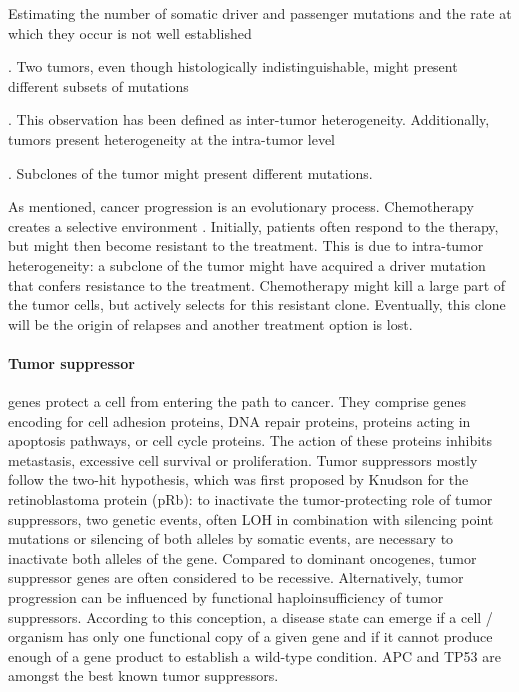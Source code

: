       Estimating the number of somatic driver and passenger mutations and the
      rate at which they occur is not well established {\cite{driver_passenger}.
      Two tumors, even though histologically indistinguishable, might present
      different subsets of mutations {\cite{driver_passenger}
      {\cite{intertumor}}. This observation has been defined as inter-tumor
      heterogeneity. Additionally, tumors present heterogeneity at the
      intra-tumor level {\cite{intratumor}. Subclones of the tumor might present
      different mutations.

      As mentioned, cancer progression is an evolutionary process. Chemotherapy
      creates a selective environment {\cite{selective_chemo}}. Initially,
      patients often respond to the therapy, but might then become resistant to
      the treatment. This is due to intra-tumor heterogeneity: a subclone of the
      tumor might have acquired a driver mutation that confers resistance to the
      treatment. Chemotherapy might kill a large part of the tumor cells, but
      actively selects for this resistant clone. Eventually, this clone will be
      the origin of relapses and another treatment option is lost.

      \paragraph{Tumor suppressor} genes protect a cell from entering the path
      to cancer. They comprise genes encoding for cell adhesion proteins,  DNA
      repair proteins, proteins acting in apoptosis pathways, or cell cycle
      proteins. The action of these proteins inhibits metastasis, excessive cell
      survival or proliferation. Tumor suppressors mostly follow the two-hit
      hypothesis, which was first proposed by Knudson for the retinoblastoma
      protein (pRb): to inactivate the tumor-protecting role of tumor
      suppressors, two genetic events, often LOH in  combination with silencing
      point mutations or silencing of both alleles by somatic events, are
      necessary to inactivate both alleles of the gene.
      Compared to dominant oncogenes, tumor suppressor genes are often
      considered to be recessive. Alternatively, tumor progression can be
      influenced by functional haploinsufficiency of tumor suppressors.
      According to this conception, a disease state can emerge if a cell /
      organism has only one functional copy of a given gene and if it cannot
      produce enough of a gene product to establish a wild-type condition. APC
      and TP53 are amongst the best known tumor suppressors.

}}}

